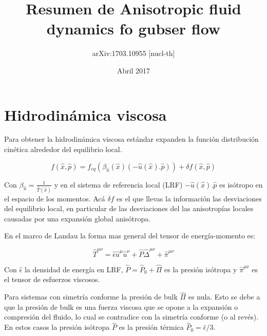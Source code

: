 \documentclass[11pt,a4paper]{article}
\begin{document}
\title{\Huge Resumen de Anisotropic fluid dynamics fo gubser flow}
\author{\huge  arXiv:1703.10955 [nucl-th]}





\date{Abril 2017}

\renewcommand{\headrulewidth}{0.5pt}




\maketitle

\section{Hidrodinámica viscosa}

Para obtener la hidrodinámica viscosa estándar expanden la función distribución cinética alrededor del equilibrio local.

\begin{equation}
f( \hat{x}, \hat{p})= f_{eq}(\beta_{\hat{u}}(\hat{x})(-\hat{u}(\hat{x}).\hat{p}))+{\delta}f( \hat{x}, \hat{p})
\label{expansion}
\end{equation}

Con $\beta_{\hat{u}}=\frac{1}{\hat{T}(\hat{x})}$ y en el sistema de referencia local (LRF) $-\hat{u}(\hat{x}).\hat{p}$ es isótropo en el espacio de los momentos. Acá ${\delta}f$ es el que llevas la información las desviaciones del equilibrio local, en particular de las desviaciones del las anisotropías locales causadas por una expansión global anisótropa.



En el marco de Landau la forma mas general del tensor de energía-momento es:

\begin{equation}
\hat{T}^{{\mu}{\nu}}= \hat{\epsilon}\hat{u}^{\mu}\hat{u}^{\nu}+\hat{P}\hat{\Delta}^{{\mu}{\nu}}+\hat{\pi}^{{\mu}{\nu}}
\end{equation}

Con $\hat{\epsilon}$ la densidad de energía en LRF, $\hat{P}=\hat{P}_{0}+\hat{\Pi}$ es la presión isótropa y $\hat{\pi}^{{\mu}{\nu}}$ es el tensor de esfuerzos viscosos.

Para sistemas con simetría conforme la presión de bulk $\hat{\Pi}$ es nula. Esto se debe a que la presión de bulk es una fuerza viscosa que se opone a la expansión o compresión del fluido, lo cual se contradice con la simetría conforme (o al revés). En estos casos la presión isótropa  $\hat{P}$ es la presión térmica $\hat{P}_{0}=\hat{\epsilon}/3$.
\end{document}
